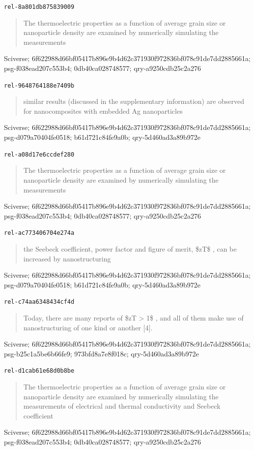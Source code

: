 \documentclass[11pt,a4paper]{article}
\begin{document}
\noindent\texttt{rel-8a801db875839009} \cite{LimitationsOfZtAsAFigure201962331153}
\begin{quote}The thermoelectric properties as a function of average grain size or nanoparticle density are examined by numerically simulating the measurements\end{quote}
{\small Sciverse; 6f622988d66bf05417b896e9b4d62c371930f972836bf078c91de7dd2885661a; psg-f038ead207c553b4; 0db40ca028748577; qry-a9250cdb25c2a276}

\noindent\texttt{rel-9648764188e7409b} \cite{LimitationsOfZtAsAFigure201962331153}
\begin{quote}similar results (discussed in the supplementary information) are observed for nanocomposites with embedded Ag nanoparticles\end{quote}
{\small Sciverse; 6f622988d66bf05417b896e9b4d62c371930f972836bf078c91de7dd2885661a; psg-d079a70404fe0518; b61d721c84fe9a0b; qry-5d460ad3a89b972e}

\noindent\texttt{rel-a08d17e6ccdef280} \cite{LimitationsOfZtAsAFigure201962331153}
\begin{quote}The thermoelectric properties as a function of average grain size or nanoparticle density are examined by numerically simulating the measurements\end{quote}
{\small Sciverse; 6f622988d66bf05417b896e9b4d62c371930f972836bf078c91de7dd2885661a; psg-f038ead207c553b4; 0db40ca028748577; qry-a9250cdb25c2a276}

\noindent\texttt{rel-ac773406704e274a} \cite{LimitationsOfZtAsAFigure201962331153}
\begin{quote}the Seebeck coefficient, power factor and figure of merit, \$zT\$ , can be increased by nanostructuring\end{quote}
{\small Sciverse; 6f622988d66bf05417b896e9b4d62c371930f972836bf078c91de7dd2885661a; psg-d079a70404fe0518; b61d721c84fe9a0b; qry-5d460ad3a89b972e}

\noindent\texttt{rel-c74aa6348434cf4d} \cite{LimitationsOfZtAsAFigure201962331153}
\begin{quote}Today, there are many reports of \$zT > 1\$ , and all of them make use of nanostructuring of one kind or another [4].\end{quote}
{\small Sciverse; 6f622988d66bf05417b896e9b4d62c371930f972836bf078c91de7dd2885661a; psg-b25c1a5be6b66fe9; 973bfd8a7e8f018c; qry-5d460ad3a89b972e}

\noindent\texttt{rel-d1cab61e68d0b8be} \cite{LimitationsOfZtAsAFigure201962331153}
\begin{quote}The thermoelectric properties as a function of average grain size or nanoparticle density are examined by numerically simulating the measurements of electrical and thermal conductivity and Seebeck coefficient\end{quote}
{\small Sciverse; 6f622988d66bf05417b896e9b4d62c371930f972836bf078c91de7dd2885661a; psg-f038ead207c553b4; 0db40ca028748577; qry-a9250cdb25c2a276}
\end{document}
